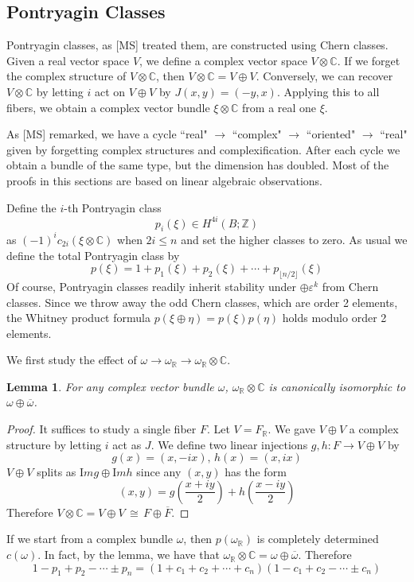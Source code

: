 \documentclass[12pt]{article}
\theoremstyle{plain}
\newtheorem{lemma}[equation]{Lemma}
\theoremstyle{definition}
\newcommand{\IC}{\mathbb{C}}
\newcommand{\IR}{\mathbb{R}}
\newcommand{\IZ}{\mathbb{Z}}
\renewcommand\Im{\mathrm Im}
\newcommand\iso{\,{\cong}\,}
\newcommand\tensor{{\otimes}}
\newcommand{\<}{\langle}
\renewcommand{\>}{\rangle}
\newcommand{\w}{\omega}
\newcommand{\sm}{\varepsilon}
\begin{document}
\subsection{Pontryagin Classes}
Pontryagin classes, as [MS] treated them, are constructed using Chern classes. Given a real vector space $V$, we define a complex vector space $V \tensor \IC$. If we forget the complex structure of $V \tensor \IC$, then $V \tensor \IC = V \oplus V$. Conversely, we can recover $V \tensor \IC$ by letting $i$ act on $V \oplus V$ by $J(x, y) = (-y, x)$. Applying this to all fibers, we obtain a complex vector bundle $\xi \tensor \IC$ from a real one $\xi$. 

As [MS] remarked, we have a cycle ``real" $\to$ ``complex" $\to$ ``oriented" $\to$ ``real" given by forgetting complex structures and complexification. After each cycle we obtain a bundle of the same type, but the dimension has doubled. Most of the proofs in this sections are based on linear algebraic observations. 

Define the $i$-th Pontryagin class 
$$ p_i (\xi) \in H^{4i}(B; \IZ) $$
as $(-1)^i c_{2i} (\xi \tensor \IC)$ when $2i \le n$ and set the higher classes to zero. As usual we define the total Pontryagin class by 
$$ p(\xi) = 1 + p_1(\xi) + p_2(\xi) + \cdots + p_{\lfloor n/2 \rfloor}(\xi) $$ 
Of course, Pontryagin classes readily inherit stability under $\oplus \sm^k$ from Chern classes. Since we throw away the odd Chern classes, which are order 2 elements, the Whitney product formula $p(\xi \oplus \eta) = p(\xi) p(\eta)$ holds modulo order 2 elements. 

We first study the effect of $\w \to \w_\IR \to \w_\IR \tensor \IC$. 

\begin{lemma}
For any complex vector bundle $\w$, $\w_\IR \tensor \IC$ is canonically isomorphic to $\w \oplus \overline{\w}$. 
\end{lemma}
\begin{proof}
It suffices to study a single fiber $F$. Let $V = F_\IR$. We gave $V \oplus V$ a complex structure by letting $i$ act as $J$. We define two linear injections $g, h : F \to V \oplus V$ by 
$$ g(x) = (x, -i x), \, h(x) = (x, ix) $$
$V \oplus V$ splits as $\Im g \oplus \Im h$ since any $(x, y)$ has the form
$$(x, y) = g(\frac{x + i y}{2}) + h(\frac{x - iy}{2})$$ 
Therefore $V \tensor \IC = V \oplus V \iso F \oplus \overline{F}$. 
\end{proof}

If we start from a complex bundle $\w$, then $p(\w_\IR)$ is completely determined $c(\w)$. In fact, by the lemma, we have that $\w_{\IR} \tensor \IC = \w \oplus \overline{\w}$. Therefore 
$$ 1 - p_1 + p_2 - \cdots \pm p_n = (1 + c_1 + c_2 + \cdots + c_n)(1 - c_1 + c_2 - \cdots \pm c_n)$$ 
\end{document}
